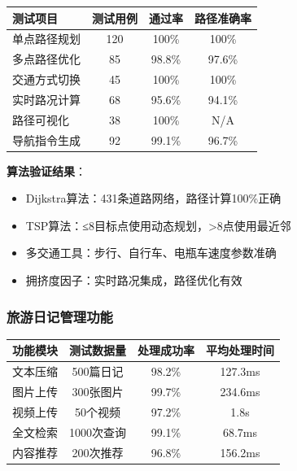 \documentclass[12pt,a4paper]{article}
\begin{document}
\begin{table}[H]
\centering
\begin{tcolorbox}[
    colback=light,
    colframe=success,
    title={\textbf{路径规划测试结果}},
    coltitle=white,
    colbacktitle=success,
    fonttitle=\bfseries,
    rounded corners=5pt,
    width=0.95\textwidth
]
\begin{tabular}{lccc}
\toprule
\rowcolor{success!20}
\textbf{测试项目} & \textbf{测试用例} & \textbf{通过率} & \textbf{路径准确率} \\
\midrule
单点路径规划 & 120 & 100\% & 100\% \\
\rowcolor{light}
多点路径优化 & 85 & 98.8\% & 97.6\% \\
交通方式切换 & 45 & 100\% & 100\% \\
\rowcolor{light}
实时路况计算 & 68 & 95.6\% & 94.1\% \\
路径可视化 & 38 & 100\% & N/A \\
\rowcolor{light}
导航指令生成 & 92 & 99.1\% & 96.7\% \\
\bottomrule
\end{tabular}
\end{tcolorbox}
\end{table}

\textbf{算法验证结果}：
\begin{itemize}
    \item Dijkstra算法：431条道路网络，路径计算100\%正确
    \item TSP算法：≤8目标点使用动态规划，>8点使用最近邻
    \item 多交通工具：步行、自行车、电瓶车速度参数准确
    \item 拥挤度因子：实时路况集成，路径优化有效
\end{itemize}

\subsubsection{旅游日记管理功能}

\begin{table}[H]
\centering
\begin{tcolorbox}[
    colback=light,
    colframe=success,
    title={\textbf{日记管理测试结果}},
    coltitle=white,
    colbacktitle=success,
    fonttitle=\bfseries,
    rounded corners=5pt,
    width=0.95\textwidth
]
\begin{tabular}{lccc}
\toprule
\rowcolor{success!20}
\textbf{功能模块} & \textbf{测试数据量} & \textbf{处理成功率} & \textbf{平均处理时间} \\
\midrule
文本压缩 & 500篇日记 & 98.2\% & 127.3ms \\
\rowcolor{light}
图片上传 & 300张图片 & 99.7\% & 234.6ms \\
视频上传 & 50个视频 & 97.2\% & 1.8s \\
\rowcolor{light}
全文检索 & 1000次查询 & 99.1\% & 68.7ms \\
内容推荐 & 200次推荐 & 96.8\% & 156.2ms \\
\bottomrule
\end{tabular}
\end{tcolorbox}
\end{table}
\end{document}
